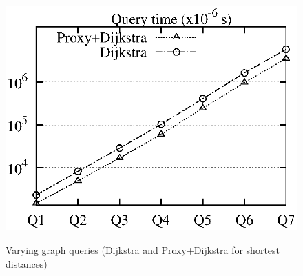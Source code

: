 \begin{figure}[t!]
\begin{center}
{\includegraphics[scale=0.422]{./exp/query_cus_dist_dj.eps}}
\hspace{-4ex}\vspace{-1.5ex}
\end{center}
\vspace{1ex}
\caption{Varying graph queries (Dijkstra and Proxy+Dijkstra for shortest distances)}
\label{fig:performance_dist_queries_dj}
\vspace{-1ex}
\end{figure}

